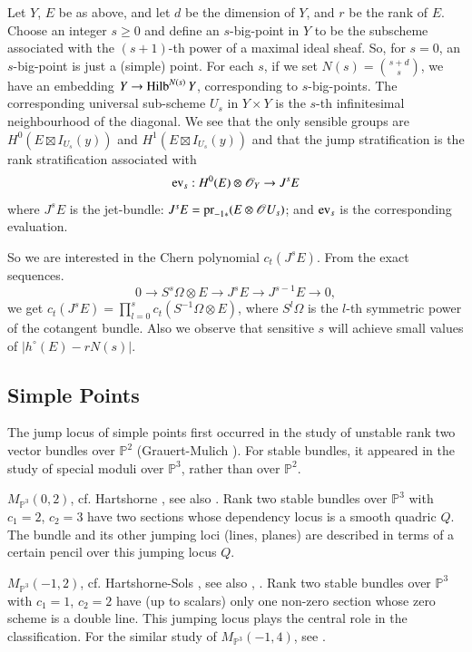 Let $Y$, $E$ be as above, and let $d$ be the dimension of $Y$, and $r$
be the rank of $E$. Choose an integer $s\geq 0$ and define an
$s$-big-point in $Y$ to be the subscheme associated with the
$(s+1)$-th power of a maximal ideal sheaf. So, for $s=0$, an
$s$-big-point is just a (simple) point. For each $s$, if we set
$N(s)=\binom{s+d}{s}$, we have an embedding $Y\to \operatorname{Hilb}^{N(s)}Y$,
corresponding to $s$-big-points. The corresponding universal
sub-scheme $U_{s}$ in $Y\times Y$ is the $s$-th infinitesimal
neighbourhood of the diagonal. We see that the only sensible groups
are $H^{0}(E\boxtimes I_{U_{s}}(y))$ and $H^{1}(E\boxtimes
I_{U_{s}}(y))$ and that the jump stratification is the rank
stratification associated with
$$
\operatorname{ev}_{s}:H^{0}(E)\otimes \mathscr{O}_{Y}\to J^{s}E
$$
where $J^{s}E$ is the jet-bundle:
$J^{s}E=\operatorname{pr}_{-1\ast}(E\otimes\mathscr{O}U_{s})$; and $\operatorname{ev}_{s}$ is the
corresponding evaluation. 

So we are interested in the Chern polynomial $c_{t}(J^{s}E)$. From the
exact sequences. 
$$
0\to S^{s}\Omega \otimes E\to J^{s}E\to J^{s-1}E\to 0,
$$
we get $c_{t}(J^{s}E)=\prod\limits^{s}_{l=0}c_{t}(S^{-1}\Omega \otimes
E)$, where $S^{l}\Omega$ is the $l$-th symmetric power of the
cotangent bundle. Also we observe that sensitive $s$ will achieve
small values of $|h^{\circ}(E)-rN(s)|$. 

\subsection{Simple Points}\label{chap6-sec9.2}

The jump locus of simple points first occurred in the study of
unstable rank two vector bundles over $\mathbb{P}^{2}$\pageoriginale
(Grauert-Mulich \cite{chap6-GM}). For stable bundles, it appeared in
the study of special moduli over $\mathbb{P}^{3}$, rather than over
$\mathbb{P}^{2}$. 

\begin{subexample}\label{chap6-exam9.2.1}
$M_{\mathbb{P}^{3}}(0,2)$, cf. Hartshorne \cite{chap6-H3}, see
also \cite{chap6-HN}. Rank two stable bundles over $\mathbb{P}^{3}$
with $c_{1}=2$, $c_{2}=3$ have two sections whose dependency locus is
a smooth quadric $Q$. The bundle and its other jumping loci (lines,
planes) are described in terms of a certain pencil over this jumping
locus $Q$. 
\end{subexample}

\begin{subexample}\label{chap6-exam9.2.2}
$M_{\mathbb{P}^{3}}(-1,2)$, cf. Hartshorne-Sols \cite{chap6-HS}, see
also \cite{chap6-M}, \cite{chap6-MW}. Rank two stable bundles over
$\mathbb{P}^{3}$ with $c_{1}=1$, $c_{2}=2$ have (up to scalars) only
one non-zero section whose zero scheme is a double line. This jumping
locus plays the central role in the classification. For the similar
study of $M_{\mathbb{P}^{3}}(-1,4)$, see \cite{chap6-BM}. 
\end{subexample}

